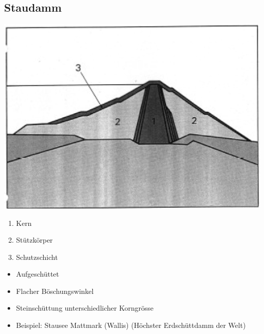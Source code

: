 \subsection{Staudamm}


\includegraphics[width=0.8\columnwidth, align=c]{images/Talsperre_3.jpg}

\vspace{0.15cm}

\begin{enumerate}
    \item Kern 
    \item Stützkörper
    \item Schutzschicht
\end{enumerate}

\vspace{0.15cm}

\begin{itemize}
  \item Aufgeschüttet
  \item Flacher Böschungswinkel
  \item Steinschüttung unterschiedlicher Korngrösse
  \item Beispiel: Stausee Mattmark (Wallis) (Höchster Erdschüttdamm der Welt)
\end{itemize}

\vspace{0.15cm}


\subsection{}


\subsection{}


\subsection{}


\subsection{}


\subsection{}


\subsection{}


\subsection{}